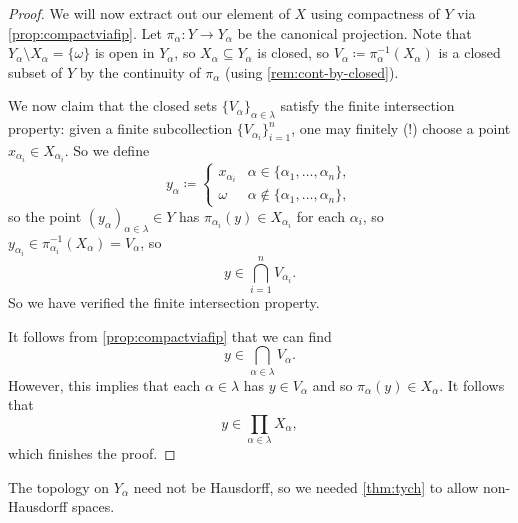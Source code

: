 \documentclass[../notes.tex]{subfiles}
\begin{document}
\begin{proof}
	We will now extract out our element of $X$ using compactness of $Y$ via \autoref{prop:compactviafip}. Let $\pi_\alpha\colon Y\to Y_\alpha$ be the canonical projection. Note that $Y_\alpha\setminus X_\alpha=\{\omega\}$ is open in $Y_\alpha$, so $X_\alpha\subseteq Y_\alpha$ is closed, so $V_\alpha\coloneqq\pi_\alpha^{-1}(X_\alpha)$ is a closed subset of $Y$ by the continuity of $\pi_\alpha$ (using \autoref{rem:cont-by-closed}).

	We now claim that the closed sets $\{V_\alpha\}_{\alpha\in\lambda}$ satisfy the finite intersection property: given a finite subcollection $\{V_{\alpha_i}\}_{i=1}^n$, one may finitely (!) choose a point $x_{\alpha_i}\in X_{\alpha_i}$. So we define
	\[y_\alpha\coloneqq\begin{cases}
		x_{\alpha_i} & \alpha\in\{\alpha_1,\ldots,\alpha_n\}, \\
		\omega & \alpha\notin\{\alpha_1,\ldots,\alpha_n\},
	\end{cases}\]
	so the point $(y_\alpha)_{\alpha\in\lambda}\in Y$ has $\pi_{\alpha_i}(y)\in X_{\alpha_i}$ for each $\alpha_i$, so $y_{\alpha_i}\in\pi_{\alpha_i}^{-1}(X_\alpha)=V_\alpha$, so
	\[y\in\bigcap_{i=1}^nV_{\alpha_i}.\]
	So we have verified the finite intersection property.

	It follows from \autoref{prop:compactviafip} that we can find
	\[y\in\bigcap_{\alpha\in\lambda}V_\alpha.\]
	However, this implies that each $\alpha\in\lambda$ has $y\in V_\alpha$ and so $\pi_\alpha(y)\in X_\alpha$. It follows that
	\[y\in\prod_{\alpha\in\lambda}X_\alpha,\]
	which finishes the proof.
\end{proof}
\begin{remark}
	The topology on $Y_\alpha$ need not be Hausdorff, so we needed \autoref{thm:tych} to allow non-Hausdorff spaces.
\end{remark}
\end{document}
